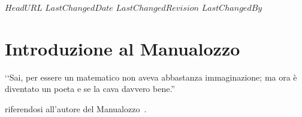 \svnidlong
{$HeadURL$}
{$LastChangedDate$}
{$LastChangedRevision$}
{$LastChangedBy$}

\chapter*{Introduzione al Manualozzo\texttrademark\ }

\begin{introduction}
‘‘Sai, per essere un matematico non aveva abbastanza immaginazione; ma ora è diventato un poeta e se la cava davvero bene.''
\begin{flushright}
	 riferendosi  all'autore del Manualozzo\texttrademark\ .
\end{flushright}
\end{introduction}
